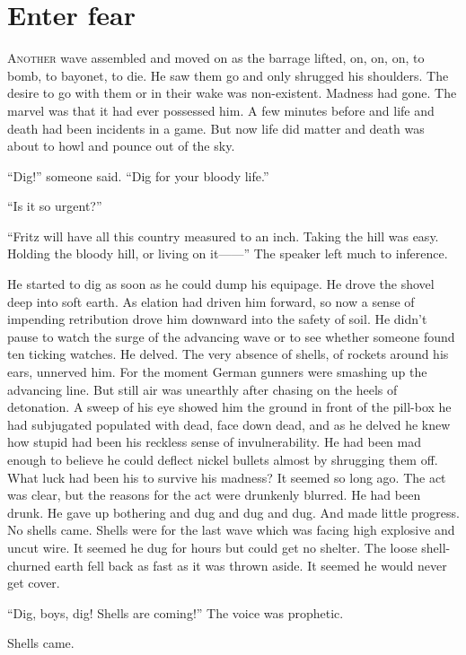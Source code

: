 \chapter*{\textsf{Enter fear}}

A\textsc{nother} wave assembled and moved on as the barrage lifted, on, on, on, to bomb, to bayonet, to die. He saw them go and only shrugged his shoulders. The desire to go with them or in their wake was non-existent. Madness had gone. The marvel was that it had ever possessed him. A few minutes before and life and death had been incidents in a game. But now life did matter and death was about to howl and pounce out of the sky.

``Dig!'' someone said. ``Dig for your bloody life.''

``Is it so urgent?''

``Fritz will have all this country measured to an inch. Taking the hill was easy. Holding the bloody hill, or living on it------'' The speaker left much to inference.

He started to dig as soon as he could dump his equipage. He drove the shovel deep into soft earth. As elation had driven him forward, so now a sense of impending retribution drove him downward into the safety of soil. He didn't pause to watch the surge of the advancing wave or to see whether someone found ten ticking watches. He delved. The very absence of shells, of rockets around his ears, unnerved him. For the moment German gunners were smashing up the advancing line. But still air was unearthly after chasing on the heels of detonation. A sweep of his eye showed him the ground in front of the pill-box he had subjugated populated with dead, face down dead, and as he delved he knew how stupid had been his reckless sense of invulnerability. He had been mad enough to believe he could deflect nickel bullets almost by shrugging them off. What luck had been his to survive his madness? It seemed so long ago. The act was clear, but the reasons for the act were drunkenly blurred. He had been drunk. He gave up bothering and dug and dug and dug. And made little progress. No shells came. Shells were for the last wave which was facing high explosive and uncut wire. It seemed he dug for hours but could get no shelter. The loose shell-churned earth fell back as fast as it was thrown aside. It seemed he would never get cover.

``Dig, boys, dig! Shells are coming!'' The voice was prophetic.

Shells came.

